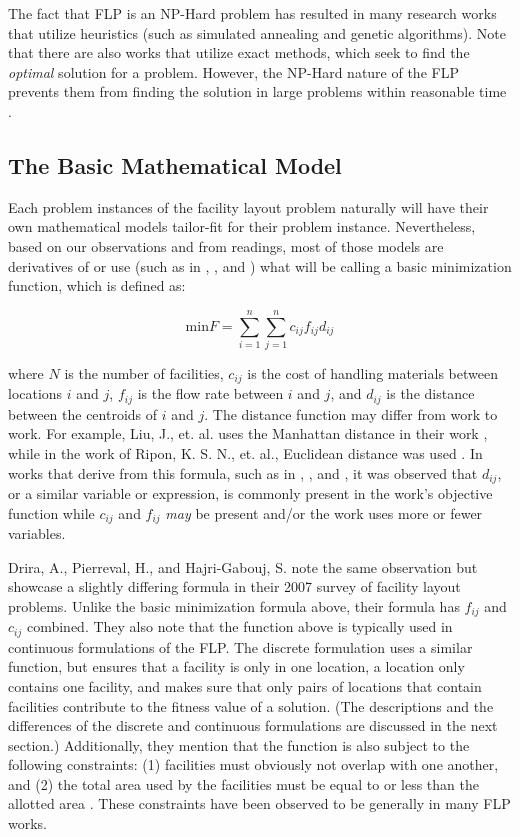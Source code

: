 The fact that FLP is an NP-Hard problem has resulted in many research works that utilize heuristics (such as simulated annealing and genetic algorithms). Note that there are also works that utilize exact methods, which seek to find the \textit{optimal} solution for a problem. However, the NP-Hard nature of the FLP prevents them from finding the solution in large problems within reasonable time \cite{Asl2015}.

\subsection{The Basic Mathematical Model}
Each problem instances of the facility layout problem naturally will have their own mathematical models tailor-fit for their problem instance. Nevertheless, based on our observations and from readings, most of those models are derivatives of or use (such as in \cite{Garcia-Hernandez2013}, \cite{Lin2019}, and \cite{Navarro2016}) what will be calling a basic minimization function, which is defined as:

$$
\text{min} F = \sum_{i=1}^{n}\sum_{j=1}^{n}c_{ij}f_{ij}d_{ij}
$$

where $N$ is the number of facilities, $c_{ij}$ is the cost of handling materials between locations $i$ and $j$, $f_{ij}$ is the flow rate between $i$ and $j$, and $d_{ij}$ is the distance between the centroids of $i$ and $j$. The distance function may differ from work to work. For example, Liu, J., et. al. uses the Manhattan distance in their work \cite{Liu2018}, while in the work of Ripon, K. S. N., et. al., Euclidean distance was used \cite{Ripon2013}. In works that derive from this formula, such as in \cite{Farmakis2018}, \cite{Solimanpur2008}, and \cite{Peng2018}, it was observed that $d_{ij}$, or a similar variable or expression, is commonly present in the work's objective function while $c_{ij}$ and $f_{ij}$ \textit{may} be present and/or the work uses more or fewer variables.

Drira, A., Pierreval, H., and Hajri-Gabouj, S. note the same observation but showcase a slightly differing formula in their 2007 survey of facility layout problems. Unlike the basic minimization formula above, their formula has $f_{ij}$ and $c_{ij}$ combined. They also note that the function above is typically used in continuous formulations of the FLP. The discrete formulation uses a similar function, but ensures that a facility is only in one location, a location only contains one facility, and makes sure that only pairs of locations that contain facilities contribute to the fitness value of a solution. (The descriptions and the differences of the discrete and continuous formulations are discussed in the next section.) Additionally, they mention that the function is also subject to the following constraints: (1) facilities must obviously not overlap with one another, and (2) the total area used by the facilities must be equal to or less than the allotted area \cite{Drira2007}. These constraints have been observed to be generally in many FLP works.


